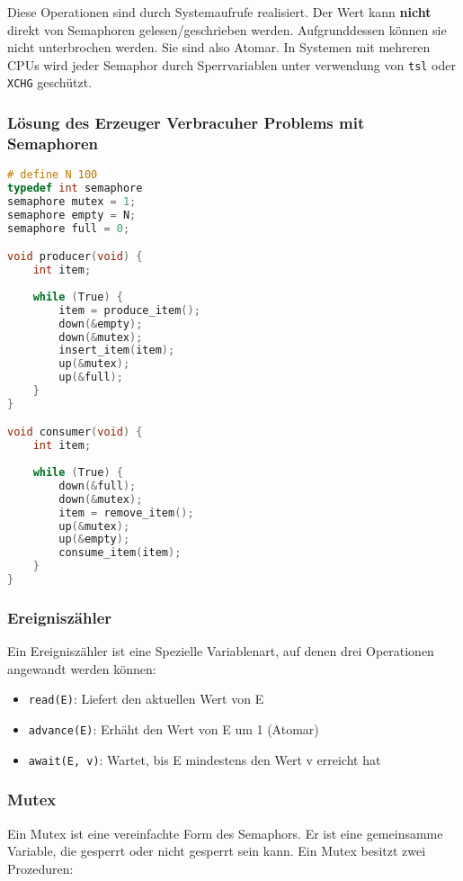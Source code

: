 Diese Operationen sind durch Systemaufrufe realisiert. Der Wert kann
\textbf{nicht} direkt von Semaphoren gelesen/geschrieben werden. Aufgrunddessen
können sie nicht unterbrochen werden. Sie sind also Atomar. In Systemen mit
mehreren CPUs wird jeder Semaphor durch Sperrvariablen unter verwendung von
\texttt{tsl} oder \texttt{XCHG} geschützt.

\subsubsection*{Lösung des Erzeuger Verbracuher Problems mit Semaphoren}

\begin{lstlisting}[language=C]
# define N 100
typedef int semaphore
semaphore mutex = 1;
semaphore empty = N;
semaphore full = 0;

void producer(void) {
    int item;
    
    while (True) {
        item = produce_item();
        down(&empty);
        down(&mutex);
        insert_item(item);
        up(&mutex);
        up(&full);
    }
} 

void consumer(void) {
    int item;
    
    while (True) {
        down(&full);
        down(&mutex);
        item = remove_item();
        up(&mutex);
        up(&empty);
        consume_item(item);
    }
}
\end{lstlisting}

\subsubsection{Ereigniszähler}

Ein Ereigniszähler ist eine Spezielle Variablenart, auf denen drei Operationen
angewandt werden können:

\begin{itemize}
    \item \texttt{read(E)}: Liefert den aktuellen Wert von E
    \item \texttt{advance(E)}: Erhäht den Wert von E um 1 (Atomar)
    \item \texttt{await(E, v)}: Wartet, bis E mindestens den Wert v erreicht hat
\end{itemize}

\subsubsection{Mutex}

Ein Mutex ist eine vereinfachte Form des Semaphors. Er ist eine gemeinsamme
Variable, die gesperrt oder nicht gesperrt sein kann. Ein Mutex besitzt zwei
Prozeduren:


